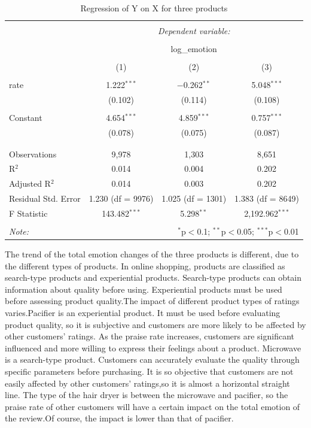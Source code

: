 \documentclass[12pt,a4paper,]{article}
\begin{document}
\begin{table}[!htbp] \centering 
  \caption{Regression of Y on X for three products} 
  \label{} 
\begin{tabular}{@{\extracolsep{5pt}}lccc} 
\\[-1.8ex]\hline 
\hline \\[-1.8ex] 
 & \multicolumn{3}{c}{\textit{Dependent variable:}} \\ 
\cline{2-4} 
\\[-1.8ex] & \multicolumn{3}{c}{log\_emotion} \\ 
\\[-1.8ex] & (1) & (2) & (3)\\ 
\hline \\[-1.8ex] 
 rate & 1.222$^{***}$ & $-$0.262$^{**}$ & 5.048$^{***}$ \\ 
  & (0.102) & (0.114) & (0.108) \\ 
  & & & \\ 
 Constant & 4.654$^{***}$ & 4.859$^{***}$ & 0.757$^{***}$ \\ 
  & (0.078) & (0.075) & (0.087) \\ 
  & & & \\ 
\hline \\[-1.8ex] 
Observations & 9,978 & 1,303 & 8,651 \\ 
R$^{2}$ & 0.014 & 0.004 & 0.202 \\ 
Adjusted R$^{2}$ & 0.014 & 0.003 & 0.202 \\ 
Residual Std. Error & 1.230 (df = 9976) & 1.025 (df = 1301) & 1.383 (df = 8649) \\ 
F Statistic & 143.482$^{***}$ & 5.298$^{**}$ & 2,192.962$^{***}$ \\ 
\hline 
\hline \\[-1.8ex] 
\textit{Note:}  & \multicolumn{3}{r}{$^{*}$p$<$0.1; $^{**}$p$<$0.05; $^{***}$p$<$0.01} \\ 
\end{tabular} 
\end{table}

The trend of the total emotion changes of the three products is
different, due to the different types of products. In online shopping,
products are classified as search-type products and experiential
products. Search-type products can obtain information about quality
before using. Experiential products must be used before assessing
product quality.The impact of different product types of ratings
varies.Pacifier is an experiential product. It must be used before
evaluating product quality, so it is subjective and customers are more
likely to be affected by other customers' ratings. As the praise rate
increases, customers are significant influenced and more willing to
express their feelings about a product. Microwave is a search-type
product. Customers can accurately evaluate the quality through specific
parameters before purchasing. It is so objective that customers are not
easily affected by other customers' ratings,so it is almost a horizontal
straight line. The type of the hair dryer is between the microwave and
pacifier, so the praise rate of other customers will have a certain
impact on the total emotion of the review.Of course, the impact is lower
than that of pacifier.
\end{document}

